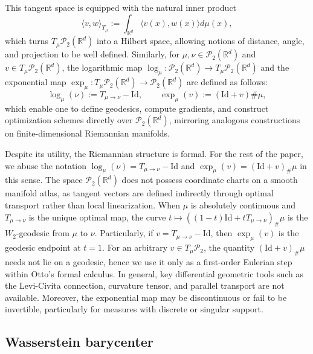 \documentclass[11pt]{article}
\newcommand{\bbR}{\mathbb{R}}
\newcommand{\calP}{\mathcal{P}}
\begin{document}
This tangent space is equipped with the natural inner product
\begin{equation*}
    \langle v,w\rangle_{T_\mu} := \int_{\bbR^d} \langle v(x), w(x) \rangle d\mu(x),
\end{equation*}
which turns $T_\mu \calP_2(\bbR^d)$ into a Hilbert space, allowing notions of distance, angle, and projection to be well defined. Similarly, for $\mu, \nu \in \calP_2(\bbR^d)$ and $v \in T_\mu \calP_2(\bbR^d)$,  the logarithmic map $\log_\mu:\calP_2(\bbR^d) \to T_\mu \calP_2(\bbR^d)$ and the exponential map $\exp_\mu:T_\mu \calP_2(\bbR^d) \to \calP_2(\bbR^d)$ are defined as follows:
\begin{equation*}
    \log_\mu(\nu) := T_{\mu\to\nu} - \text{Id},\qquad \exp_\mu(v) := (\text{Id}+v){\#} \mu,
\end{equation*}
which enable one to define geodesics, compute gradients, and construct optimization schemes directly over $\calP_2(\bbR^d)$, mirroring analogous constructions on finite-dimensional Riemannian manifolds.

Despite its utility, the Riemannian structure is formal. For the rest of the paper, we abuse the notation $\log_\mu(\nu)=T_{\mu\to\nu}-\mathrm{Id}$ and
$\exp_\mu(v)=(\mathrm{Id}+v)_{\#}\mu$ in this sense. The space $\calP_2(\bbR^d)$ does not possess coordinate charts on a smooth manifold atlas, as tangent vectors are defined indirectly through optimal transport rather than local linearization. When $\mu$ is absolutely continuous and $T_{\mu\to\nu}$ is the unique optimal map, the curve $t\mapsto ((1-t)\text{Id} + tT_{\mu\to\nu})_{\#}\mu$ is the $W_2$-geodesic from $\mu$ to $\nu$. Particularly, if $v = T_{\mu\to \nu}-\text{Id}$, then $\exp_\mu(v)$ is the geodesic endpoint at $t=1$. For an arbitrary $v\in T_\mu\mathcal P_2$, the quantity $(\text{Id}+v)_{\#}\mu$ needs not lie on a geodesic, hence we use it only as a first-order Eulerian step within Otto's formal calculus. In general, key differential geometric tools such as the Levi-Civita connection, curvature tensor, and parallel transport are not available. Moreover, the exponential map may be discontinuous or fail to be invertible, particularly for measures with discrete or singular support.

\subsection{Wasserstein barycenter}
\end{document}
